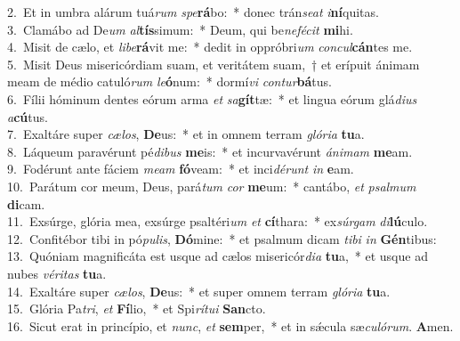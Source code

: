 {2.~}Et in umbra alárum tuá\textit{rum} \textit{spe}\textbf{rá}bo:~* donec trán\textit{se}\textit{at} \textit{i}\textbf{ní}quitas.\\
{3.~}Clamábo ad De\textit{um} \textit{al}\textbf{tís}simum:~* Deum, qui be\textit{ne}\textit{fé}\textit{cit} \textbf{mi}hi.\\
{4.~}Misit de cælo, et \textit{li}\textit{be}\textbf{rá}vit me:~* dedit in oppróbri\textit{um} \textit{con}\textit{cul}\textbf{cán}tes me.\\
{5.~}Misit Deus misericórdiam suam, et veritátem suam,~† et erípuit ánimam meam de médio catuló\textit{rum} \textit{le}\textbf{ó}num:~* dormí\textit{vi} \textit{con}\textit{tur}\textbf{bá}tus.\\
{6.~}Fílii hóminum dentes eórum arma \textit{et} \textit{sa}\textbf{gít}tæ:~* et lingua eórum glá\textit{di}\textit{us} \textit{a}\textbf{cú}tus.\\
{7.~}Exaltáre super \textit{cæ}\textit{los}, \textbf{De}us:~* et in omnem terram \textit{gló}\textit{ri}\textit{a} \textbf{tu}a.\\
{8.~}Láqueum paravérunt pé\textit{di}\textit{bus} \textbf{me}is:~* et incurvavérunt \textit{á}\textit{ni}\textit{mam} \textbf{me}am.\\
{9.~}Fodérunt ante fáciem \textit{me}\textit{am} \textbf{fó}veam:~* et inci\textit{dé}\textit{runt} \textit{in} \textbf{e}am.\\
{10.~}Parátum cor meum, Deus, pará\textit{tum} \textit{cor} \textbf{me}um:~* cantábo, \textit{et} \textit{psal}\textit{mum} \textbf{di}cam.\\
{11.~}Exsúrge, glória mea, exsúrge psaltéri\textit{um} \textit{et} \textbf{cí}thara:~* ex\textit{súr}\textit{gam} \textit{di}\textbf{lú}culo.\\
{12.~}Confitébor tibi in pó\textit{pu}\textit{lis}, \textbf{Dó}mine:~* et psalmum dicam \textit{ti}\textit{bi} \textit{in} \textbf{Gén}tibus:\\
{13.~}Quóniam magnificáta est usque ad cælos misericór\textit{di}\textit{a} \textbf{tu}a,~* et usque ad nubes \textit{vé}\textit{ri}\textit{tas} \textbf{tu}a.\\
{14.~}Exaltáre super \textit{cæ}\textit{los}, \textbf{De}us:~* et super omnem terram \textit{gló}\textit{ri}\textit{a} \textbf{tu}a.\\
{15.~}Glória Pa\textit{tri}, \textit{et} \textbf{Fí}lio,~* et Spi\textit{rí}\textit{tu}\textit{i} \textbf{San}cto.\\
{16.~}Sicut erat in princípio, et \textit{nunc}, \textit{et} \textbf{sem}per,~* et in sǽcula sæ\textit{cu}\textit{ló}\textit{rum}. \textbf{A}men.\\
